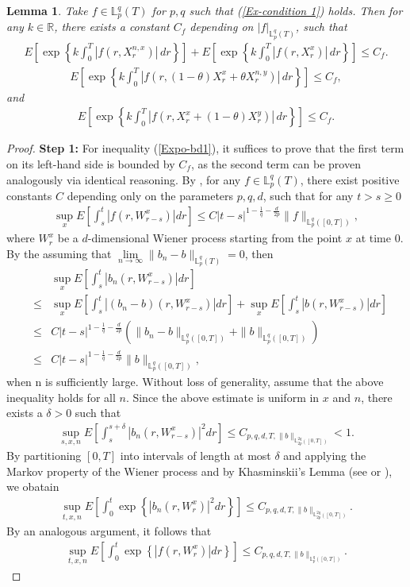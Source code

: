 \documentclass[12pt,oneside, reqno]{amsart}
\newcommand{\be}{\begin{eqnarray}}
\newcommand{\ee}{\end{eqnarray}}
\newcommand{\ce}{\begin{eqnarray*}}
\newcommand{\de}{\end{eqnarray*}}
\newtheorem{lemma}[theorem]{Lemma}
\def\mL{{\mathbb L}}
\def\mR{{\mathbb R}}
\def\geq{\geqslant}
\def\leq{\leqslant}
\numberwithin{equation}{section}
\begin{document}
\begin{lemma}\label{Ex-bd-Xn1}
	Take $f\in \mL_p^q(T)$ for $p,q$ such that (\ref{Ex-condition 1}) holds. Then
	for any $k\in \mR$, there exists a constant $C_f$ depending  on $|f|_{\mL_p^q(T)}$, such that 
	\be\label{Expo-bd1}
	E\left [\exp\left\{k\int_0^T |f(r,X_r^{n,x})|\,dr\right \}\right]+E\left [\exp\left\{k\int_0^T |f(r,X_r^{x})|\,dr\right \}\right]\leq C_f.
	\ee 
	\be\label{Expo-combin-bd2}
	E\left [\exp\left\{k\int_0^T |f(r,(1-\theta)X_r^{x}+\theta X_r^{n,y})|\,dr\right \}\right]\leq C_f,
	\ee
	and
		\be\label{Expo-combin-bd3}
	E\left [\exp\left\{k\int_0^T |f(r,X_r^{x}+(1-\theta) X_r^{y})|\,dr\right \}\right]\leq C_f.
	\ee
\end{lemma}
\begin{proof}
	
	\textbf{Step 1:}  For inequality (\ref{Expo-bd1}), it suffices to prove that the first term on its left-hand side is bounded by  $C_f$, as the second term can be proven analogously via identical reasoning. By \cite[Lemma 2.1]{Flandoli-2013},  for any $f\in \mL_p^q(T)$, there exist positive constants $C$ depending only on the parameters $p,q,d$, such that for any $t>s\geq 0$
	\be\label{Cite-Krolv-Es1}
	\sup_x E\left[\int_s^t |f(r,W_{r-s}^x)|dr \right]\leq C|t-s|^{1-\frac{1}{q}-\frac{d}{2p}} \|f\|_{\mL_p^q([0,T])}, 
	\ee 
 where	$W_{r}^x$ be a $d$-dimensional Wiener process starting from the point $x$ at time 0. By the assuming that $\lim\limits_{n\to \infty} \|b_n-b\|_{\mL_p^q(T)}=0$, then 
 \ce 
 &&\sup_x E\left[\int_s^t |b_n(r,W_{r-s}^x)|dr \right]\\
 &\leq& \sup_x E\left[\int_s^t |(b_n-b)(r,W_{r-s}^x)|dr \right]+\sup_x E\left[\int_s^t |b(r,W_{r-s}^x)|dr \right]\\
 &\leq& C|t-s|^{1-\frac{1}{q}-\frac{d}{2p}} (\|b_n-b\|_{\mL_p^q([0,T])}+\|b\|_{\mL_p^q([0,T])})\\
 &\leq& C|t-s|^{1-\frac{1}{q}-\frac{d}{2p}} \|b\|_{\mL_p^q([0,T])},
 \de 
 when n is sufficiently large. Without loss of generality, assume that the above inequality holds for all $n$.  Since the  above estimate is uniform in $x$ and $n$,  there exists a
 $\delta>0 $  such that 
 \ce 
 \sup_{s,x,n} E\left[\int_s^{s+\delta} |b_n(r,W_{r-s}^x)|^2dr \right]\leq C_{p,q,d,T,\|b\|_{\mL_{2p}^{2q}([0,T])}}<1.
 \de 
 By partitioning $[0,T]$ into intervals of length at most $\delta$ and applying the Markov property of the Wiener process and by Khasminskii’s Lemma (see \cite[Lemma 2.1]{Sznitman1998} or  \cite{Khasminskii1959}), we obatain 
\be\label{Ex-Es11} 
\sup_{t,x,n} E\left[\int_0^{t} \exp\left\{|b_n(r,W_{r}^x)|^2dr\right\} \right]\leq C_{p,q,d,T,\|b\|_{\mL_{2p}^{2q}([0,T])}}.
\ee 
By an analogous argument, it follows that
\be\label{Ex-Es112} 
\sup_{t,x,n} E\left[\int_0^{t} \exp\left\{|f(r,W_{r}^x)|dr\right\} \right]\leq C_{p,q,d,T,\|b\|_{\mL_{p}^{q}([0,T])}}.
\ee 


\end{proof}
\end{document}
